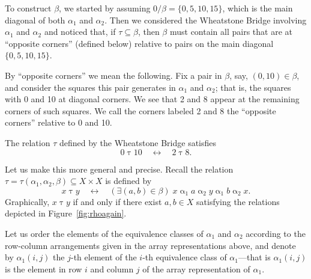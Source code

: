 \documentclass{amsart}
\theoremstyle{plain}
\theoremstyle{definition}
\theoremstyle{definition}
\numberwithin{equation}{section}
\newcommand{\<}{\ensuremath{\langle}}
\renewcommand{\>}{\ensuremath{\rangle}}
\newcommand{\ralpha}{\ensuremath{\mathrel{\alpha}}}
\newcommand{\rtau}{\ensuremath{\mathrel{\tau}}}
\begin{document}
To construct $\beta$, we started by assuming $0/\beta = \{0,5,10,15\}$,
which is the main diagonal of both $\alpha_1$ and $\alpha_2$.  Then we considered the
Wheatstone Bridge involving $\alpha_1$ and $\alpha_2$ and noticed that, if
$\tau \subseteq \beta$, then $\beta$ must contain all pairs that are at
``opposite corners'' (defined below)
relative to pairs on the main diagonal
$\{0,5,10,15\}$. 


By ``opposite corners'' we mean the following.  Fix a pair in $\beta$, say,
$(0,10)\in \beta$, and consider the squares this pair generates in $\alpha_1$
and $\alpha_2$; that is, the squares with 0 and 10 at diagonal corners. We see
that 2 and 8 appear at the remaining corners of such squares.  We call the
corners labeled 2 and 8 the ``opposite corners'' relative to 0 and 10. 

The relation $\tau$ defined by the Wheatstone Bridge satisfies 
\[
0 \rtau 10 \quad \longleftrightarrow \quad 2\rtau 8.
\]

Let us make this more general and precise.
Recall the relation $\tau=\tau(\alpha_1, \alpha_2, \beta)\subseteq X\times X$ is
defined by
\begin{equation}
\label{eq:5}  
x \mathrel{\tau} y \quad \longleftrightarrow \quad (\exists (a, b) \in \beta)\;  
x \ralpha_1 a \ralpha_2 y \ralpha_1 b \ralpha_2 x.
\end{equation}
Graphically, $x \mathrel{\tau} y$ if and only if there exist $a, b \in X$
satisfying the relations depicted in Figure~\ref{fig:rhoagain}.  

Let us order the elements of the equivalence classes of $\alpha_1$
and $\alpha_2$ according to the row-column arrangements given in the array
representations above, and
denote by $\alpha_1(i,j)$ the $j$-th element of the $i$-th equivalence class of
$\alpha_1$---that is $\alpha_1(i,j)$ is the element in row $i$ and column $j$ of
the array representation of $\alpha_1$.
\end{document}
